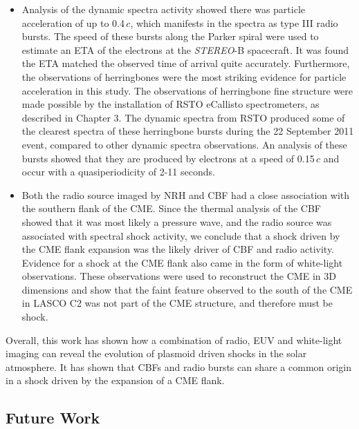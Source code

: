 \begin{itemize}
\item Analysis of the dynamic spectra activity showed there was particle acceleration of up to 0.4\,$c$, which manifests in the spectra as type III radio bursts. The speed of these bursts along the Parker spiral were used to estimate an ETA of the electrons at the \emph{STEREO}-B spacecraft. It was found the ETA matched the observed time of arrival quite accurately. Furthermore, the observations of herringbones were the most striking evidence for particle acceleration in this study. The observations of herringbone fine structure were made possible by the installation of RSTO eCallisto spectrometers, as described in Chapter 3. The dynamic spectra from RSTO produced some of the clearest spectra of these herringbone bursts during the 22 September 2011 event, compared to other dynamic spectra observations. An analysis of these bursts showed that they are produced by electrons at a speed of 0.15\,$c$ and occur with a quasiperiodicity of 2-11 seconds.
\item Both the radio source imaged by NRH and CBF had a close association with the southern flank of the CME. Since the thermal analysis of the CBF showed that it was most likely a pressure wave, and the radio source was associated with spectral shock activity, we conclude that a shock driven by the CME flank expansion was the likely driver of CBF and radio activity. Evidence for a shock at the CME flank also came in the form of white-light observations. These observations were used to reconstruct the CME in 3D dimensions and show that the faint feature observed to the south of the CME in LASCO C2 was not part of the CME structure, and therefore must be shock.
\end{itemize}
Overall, this work has shown how a combination of radio, EUV and white-light imaging can reveal the evolution of plasmoid driven shocks in the solar atmosphere. It has shown that CBFs and radio bursts can share a common origin in a shock driven by the expansion of a CME flank.

\subsection{Future Work}

